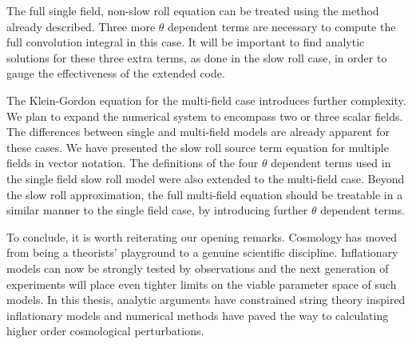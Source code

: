 The full single field, non-slow roll equation can be treated using the
method already described. 
Three more $\theta$ dependent terms are necessary to
compute the full convolution integral in this case. It will be important to find
analytic solutions for these three extra terms, as done in the slow roll case, in
order to gauge the effectiveness of the extended code.

The Klein-Gordon equation for the multi-field case introduces further complexity. We plan to
expand the numerical system to encompass two or three scalar fields. The differences
between single and multi-field models are already apparent for these cases. We have
presented the slow roll source term equation for multiple fields in vector notation.
The definitions of the four $\theta$ dependent terms used in the single
field slow roll model were also extended to the multi-field case. Beyond the slow
roll approximation, the full multi-field equation should be treatable in a similar
manner to the single field case, by introducing further $\theta$ dependent terms.



To conclude, it is worth reiterating our opening remarks. Cosmology has moved from
being a theorists' playground to a genuine scientific discipline. Inflationary models can
now be strongly tested by observations and the next generation of experiments will
place even tighter limits on the viable parameter space of such models. In this thesis, analytic
arguments have constrained string theory inspired inflationary models and numerical
methods have paved the way to calculating higher order cosmological perturbations.
